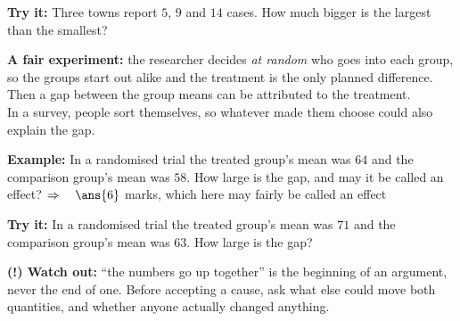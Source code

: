 \documentclass[12pt]{article}
\begin{document}
\begin{tryitbox}
\textbf{Try it:} \quad Three towns report $5$, $9$ and $14$ cases. How much bigger is the largest
than the smallest?\\[2pt]
\end{tryitbox}


\begin{formulabox}
\textbf{A fair experiment:} the researcher decides \textit{at random} who goes into each group, so
the groups start out alike and the treatment is the only planned difference. Then a gap between
the group means can be attributed to the treatment.\\[3pt]
In a survey, people sort themselves, so whatever made them choose could also explain the gap.
\end{formulabox}

\begin{examplebox}
\textbf{Example:} \quad In a randomised trial the treated group's mean was $64$ and the comparison
group's mean was $58$. How large is the gap, and may it be called an effect?
$\Rightarrow\quad \ans{6}$ marks, which here may fairly be called an effect
\end{examplebox}

\begin{tryitbox}
\textbf{Try it:} \quad In a randomised trial the treated group's mean was $71$ and the comparison
group's mean was $63$. How large is the gap?\\[2pt]
\end{tryitbox}

\begin{watchoutbox}
\textbf{(!) Watch out:} ``the numbers go up together'' is the beginning of an argument, never the
end of one. Before accepting a cause, ask what else could move both quantities, and whether anyone
actually changed anything.
\end{watchoutbox}
\end{document}

